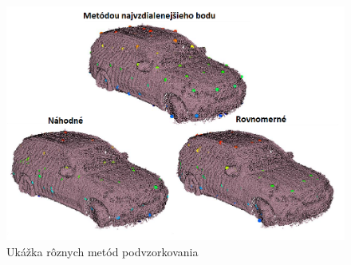 \begin{figure}[!htbp]
  \centering
  \includegraphics[width=14cm]{img/downsample.png}
  \caption{Ukážka rôznych metód podvzorkovania \cite{downsample_img}}
  \label{noname}
\end{figure}

